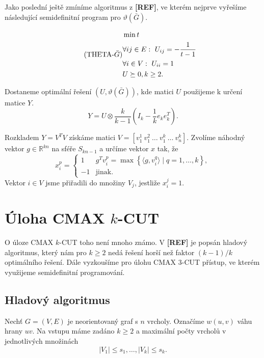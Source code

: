 Jako poslední ještě zmíníme algoritmus z \textbf{[REF]}, ve kterém nejprve vyřešíme následující semidefinitní program pro $\vartheta(\bar{G})$.

\begin{equation}\tag{THETA-$\bar{G}$}
    \begin{split}
        &\min t \\
        &\forall ij \in E:\ U_{ij} = -\frac{1}{t - 1} \\
        &\forall i \in V:\ U_{ii} = 1 \\
        &U \succeq 0, k \geq 2.
    \end{split}
    \label{eq:THETA-BAR-G}
\end{equation}

\noindent Dostaneme optimální řešení $(U, \vartheta(\bar{G}))$, kde matici $U$ použijeme k určení matice $Y$.
$$
    Y = U \otimes \frac{k}{k - 1} \left( I_k - \frac{1}{k} e_k e_k^T \right).
$$

\noindent Rozkladem $Y = V^TV$ získáme matici $V = \left[ v_1^1\ v_1^2\ \dots\ v_1^k\ \dots\ v_n^k \right]$.
Zvolíme náhodný vektor $g \in \mathbb{R}^{kn}$ na sféře $S_{kn-1}$ a určíme vektor $x$ tak, že
$$
    x_i^p = 
    \begin{cases}
        1  & g^T v_i^p = \max \left\{ \langle g, v_i^q \rangle \mid q = 1, \dots, k \right\}, \\
        -1 & \text{jinak.}
    \end{cases}
$$
Vektor $i \in V$ jsme přiřadili do množiny $V_j$, jestliže $x_i^j = 1$.


\section{Úloha CMAX $k$-CUT}

O úloze CMAX $k$-CUT toho není mnoho známo. V \textbf{[REF]} je popsán hladový algoritmus, který nám pro $k \geq 2$ nedá řešení horší než faktor $(k-1) / k$ optimálního řešení. Dále vyzkoušíme pro úlohu CMAX $3$-CUT přístup, ve kterém využijeme semidefinitní programování.

\subsection{Hladový algoritmus}

Nechť $G = (V,E)$ je neorientovaný graf s $n$ vrcholy. Označíme $w(u,v)$ váhu hrany $uv$. Na vstupu máme zadáno $k \geq 2$ a maximální počty vrcholů v jednotlivých množinách
$$
    |V_1| \leq s_1, \dots, |V_k| \leq s_k.
$$

